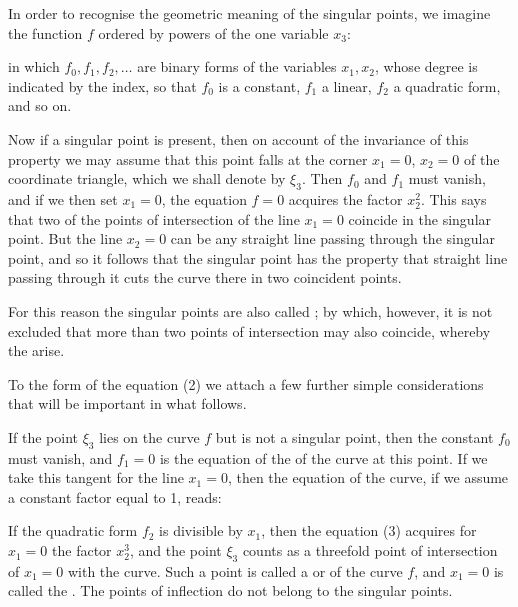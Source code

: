 In order to recognise the geometric meaning of the singular points, we imagine the function $f$ ordered by powers of the one variable $x_3$:

in which $f_0, f_1, f_2, \dots$ are binary forms of the variables $x_1, x_2$, whose degree is indicated by the index, so that $f_0$ is a constant, $f_1$ a linear, $f_2$ a quadratic form, and so on.

Now if a singular point is present, then on account of the invariance of this property we may assume that this point falls at the corner $x_1 = 0$, $x_2 = 0$ of the coordinate triangle, which we shall denote by $\xi_3$. Then $f_0$ and $f_1$ must vanish, and if we then set $x_1 = 0$, the equation $f = 0$ acquires the factor $x_2^2$. This says that two of the points of intersection of the line $x_1 = 0$ coincide in the singular point. But the line $x_2 = 0$ can be any straight line passing through the singular point, and so it follows that the singular point has the property that  straight line passing through it cuts the curve there in two coincident points. %

For this reason the singular points are also called ; by which, however, it is not excluded that more than two points of intersection may also coincide, whereby the  arise.

To the form of the equation (2) we attach a few further simple considerations that will be important in what follows.

If the point $\xi_3$ lies on the curve $f$ but is not a singular point, then the constant $f_0$ must vanish, and $f_1 = 0$ is the equation of the  of the curve at this point. If we take this tangent for the line $x_1 = 0$, then the equation of the curve, if we assume a constant factor equal to 1, reads:

If the quadratic form $f_2$ is divisible by $x_1$, then the equation (3) acquires for $x_1 = 0$ the factor $x_2^3$, and the point $\xi_3$ counts as a threefold point of intersection of $x_1 = 0$ with the curve. Such a point is called a  or  of the curve $f$, and $x_1 = 0$ is called the . The points of inflection do not belong to the singular points.
